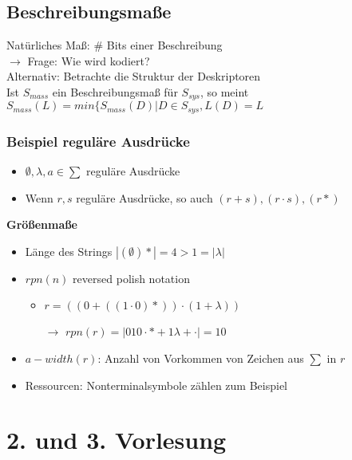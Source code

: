 \documentclass[ngerman]{scrartcl}
\begin{document}
\subsection{Beschreibungsmaße}
Natürliches Maß:
\# Bits einer Beschreibung \\
 $\rightarrow$ Frage: Wie wird kodiert? \\
Alternativ: Betrachte die Struktur der Deskriptoren \\
Ist $S_{mass}$ ein Beschreibungsmaß für $S_{sys}$, so meint \\$S_{mass}(L)=min\{ S_{mass}(D) | D \in S_{sys}, L(D) = L$

\subsubsection{\textbf{Beispiel} reguläre Ausdrücke}
\begin{itemize}
\item $\emptyset, \lambda, a\in \sum$ reguläre Ausdrücke
\item Wenn $r,s$ reguläre Ausdrücke, so auch $(r+s),(r \cdot s),(r*)$
\end{itemize}

\textbf{Größenmaße}
\begin{itemize}
\item Länge des Strings $|(\emptyset)*| = 4 > 1 = |\lambda|$
\item $rpn(n)$ reversed polish notation
\begin{itemize}
\item $r = ((0+((1 \cdot 0)*)) \cdot (1 + \lambda))$
\item[$\rightarrow$] $rpn(r) = |010\cdot * + 1 \lambda + \cdot| = 10$
\end{itemize}
\item $a-width(r)$: Anzahl von Vorkommen von Zeichen aus $\sum$ in $r$
\item Ressourcen: Nonterminalsymbole zählen zum Beispiel
\end{itemize}

\section{2. und 3. Vorlesung}
\end{document}
